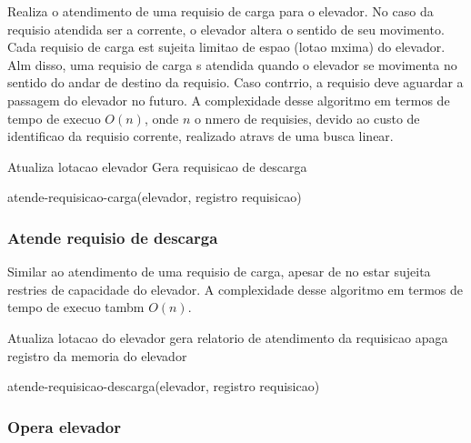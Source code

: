 \documentclass[12pt]{article}
\begin{document}
Realiza o atendimento de uma requisio de carga para o elevador. No caso da requisio atendida ser a corrente, o elevador altera o sentido de seu movimento. Cada requisio de carga est sujeita  limitao de espao (lotao mxima) do elevador. Alm disso, uma requisio de carga s  atendida quando o elevador se movimenta no sentido do andar de destino da requisio. Caso contrrio, a requisio deve aguardar a passagem do elevador no futuro. A complexidade desse algoritmo em termos de tempo de execuo  $O(n)$, onde $n$  o nmero de requisies, devido ao custo de identificao da requisio corrente, realizado atravs de uma busca linear.
\begin{algorithm}[h!]
\begin{footnotesize}


	Atualiza lotacao elevador\;
	Gera requisicao de descarga\;

\caption{atende-requisicao-carga(elevador, registro requisicao)}%
\end{footnotesize}
\end{algorithm}

\subsubsection{Atende requisio de descarga}

Similar ao atendimento de uma requisio de carga, apesar de no estar sujeita  restries de capacidade do elevador. A complexidade desse algoritmo em termos de tempo de execuo tambm  $O(n)$.
\begin{algorithm}[h!]
\begin{footnotesize}


	Atualiza lotacao do elevador\;
	gera relatorio de atendimento da requisicao\;
	apaga registro da memoria do elevador\;

\caption{atende-requisicao-descarga(elevador, registro requisicao)}%
\end{footnotesize}
\end{algorithm}


\subsubsection{Opera elevador}
\end{document}
